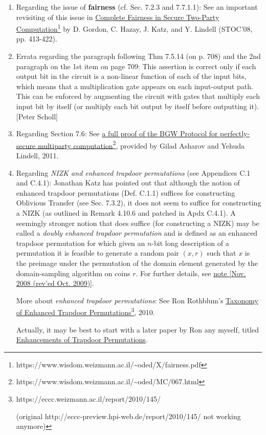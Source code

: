 \documentclass[10pt,a4paper]{article}
\begin{document}
\begin{enumerate}
	\item Regarding the issue of \textbf{fairness} (cf. Sec. 7.2.3 and 7.7.1.1): See an important revisiting of this issue in \href{https://www.wisdom.weizmann.ac.il/~oded/X/fairness.pdf}{Complete Fairness in Secure Two-Party Computation}\footnote{https://www.wisdom.weizmann.ac.il/\textasciitilde oded/X/fairness.pdf} by D. Gordon, C. Hazay, J. Katz, and Y. Lindell (STOC'08, pp. 413-422).
	\item Errata regarding the paragraph following Thm 7.5.14 (on p. 708) and the 2nd paragraph on the 1st item on page 709: This assertion is correct only if each output bit in the circuit is a non-linear function of each of the input bits, which means that a multiplication gate appears on each input-output path. This can be enforced by augmenting the circuit with gates that multiply each input bit by itself (or multiply each bit output by itself before outputting it). [Peter Scholl]
	\item Regarding Section 7.6: See \href{https://www.wisdom.weizmann.ac.il/~oded/MC/067.html}{a full proof of the BGW Protocol for perfectly-secure multiparty computation}\footnote{https://www.wisdom.weizmann.ac.il/\textasciitilde oded/MC/067.html}, provided by Gilad Asharov and Yehuda Lindell, 2011.
	\item Regarding \textit{NIZK and enhanced trapdoor permutations} (see Appendices C.1 and C.4.1): Jonathan Katz has pointed out that although the notion of enhanced trapdoor permutations (Def. C.1.1) suffices for constructing Oblivious Transfer (see Sec. 7.3.2), it does not seem to suffice for constructing a NIZK (as outlined in Remark 4.10.6 and patched in Apdx C.4.1). A seemingly stronger notion that does suffice (for constructing a NIZK) may be called a \textit{doubly enhanced trapdoor permutation} and is defined as an enhanced trapdoor permutation for which given an $n$-bit long description of a permutation it is feasible to generate a random pair $(x,r)$ such that $x$ is the preimage under the permutation of the domain element generated by the domain-sampling algorithm on coins $r$. For further details, see \href{https://www.wisdom.weizmann.ac.il/~oded/PSBookFrag/nizk-tdp.ps}{note [Nov. 2008 (rev'ed Oct. 2009)]}. 
	
	More about \textit{enhanced trapdoor permutations}: See Ron Rothblum's \href{https://eccc.weizmann.ac.il/report/2010/145/}{Taxonomy of Enhanced Trapdoor Permutations}\footnote{https://eccc.weizmann.ac.il/report/2010/145/ 
		
	\nobreakspace\nobreakspace(original http://eccc-preview.hpi-web.de/report/2010/145/ not working anymore)}, 2010. 
	
	Actually, it may be best to start with a later paper by Ron any myself, titled \href{https://www.wisdom.weizmann.ac.il/~oded/p_tdp.html}{Enhancements of Trapdoor Permutations}.
\end{enumerate}
\end{document}
